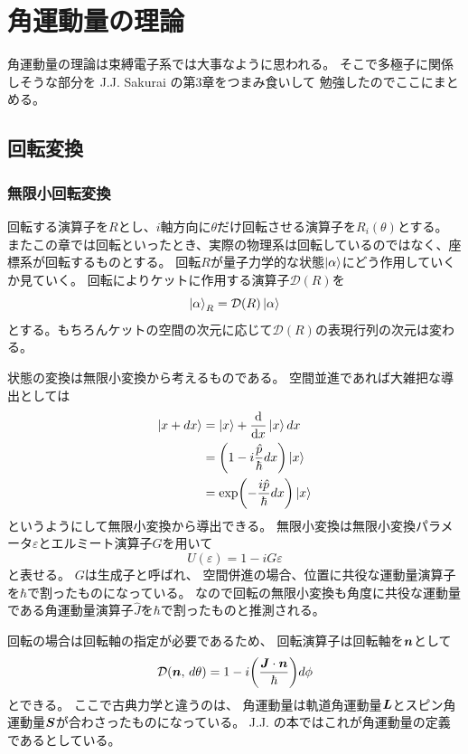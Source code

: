 \documentclass[../master.tex]{subfiles}
\begin{document}
\chapter{角運動量の理論}
角運動量の理論は束縛電子系では大事なように思われる。
そこで多極子に関係しそうな部分を J.J. Sakurai \cite{JJSakurai} の第3章をつまみ食いして
勉強したのでここにまとめる。

\section{回転変換}
\subsection{無限小回転変換}

回転する演算子を\(R\)とし、\(i\)軸方向に\(\theta\)だけ回転させる演算子を\(R_i(\theta)\)とする。
またこの章では回転といったとき、実際の物理系は回転しているのではなく、座標系が回転するものとする。
回転\(R\)が量子力学的な状態\(\ket{\alpha}\)にどう作用していくか見ていく。
回転によりケットに作用する演算子\(\mathcal{D}(R)\)を
\begin{equation}
    \ket{\alpha}_R = \mathcal{D}(R) \ket{\alpha}
\end{equation}
とする。もちろんケットの空間の次元に応じて\(\mathcal{D}(R)\)の表現行列の次元は変わる。

状態の変換は無限小変換から考えるものである。
空間並進であれば大雑把な導出としては
\begin{align}
    \ket{x+ dx}
    &= \ket{x} + \dv{x}\ket{x} dx \\
    &= \qty(1-i\frac{\hat{p}}{\hbar}dx)\ket{x}\\
    &= \exp(-\frac{i\hat{p}}{\hbar}dx)\ket{x}
\end{align}
というようにして無限小変換から導出できる。
無限小変換は無限小変換パラメータ\(\varepsilon\)とエルミート演算子\(G\)を用いて
\begin{equation}
    U(\varepsilon) = 1-iG\varepsilon
\end{equation}
と表せる。
\(G\)は生成子と呼ばれ、
空間併進の場合、位置に共役な運動量演算子を\(\hbar\)で割ったものになっている。
なので回転の無限小変換も角度に共役な運動量である角運動量演算子\(\hat{J}\)を\(\hbar\)で割ったものと推測される。

回転の場合は回転軸の指定が必要であるため、
回転演算子は回転軸を\(\vb*{n}\)として
\begin{equation}
    \mathcal{D}(\vb*{n},\,d\theta) = 1-i\qty(\frac{\vb*{J}\cdot\vb*{n}}{\hbar})d\phi
\end{equation}
とできる。
ここで古典力学と違うのは、
角運動量は軌道角運動量\(\vb*{L}\)とスピン角運動量\(\vb*{S}\)が合わさったものになっている。
J.J. の本ではこれが角運動量の定義であるとしている。
\end{document}
